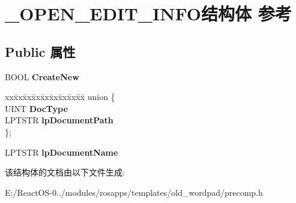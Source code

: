 \hypertarget{struct___o_p_e_n___e_d_i_t___i_n_f_o}{}\section{\+\_\+\+O\+P\+E\+N\+\_\+\+E\+D\+I\+T\+\_\+\+I\+N\+F\+O结构体 参考}
\label{struct___o_p_e_n___e_d_i_t___i_n_f_o}
\subsection*{Public 属性}
\begin{DoxyCompactItemize}
\item 
\mbox{\label{struct___o_p_e_n___e_d_i_t___i_n_f_o_a209497dd2a4aeb781d297c8f31c56e77}} 
B\+O\+OL {\bfseries Create\+New}
\item 
\mbox{\label{struct___o_p_e_n___e_d_i_t___i_n_f_o_a40269d2e3053359b0c18fdea179f8528}} 
\begin{tabbing}
xx\=xx\=xx\=xx\=xx\=xx\=xx\=xx\=xx\=\kill
union \{\\
\>UINT {\bfseries DocType}\\
\>LPTSTR {\bfseries lpDocumentPath}\\
\}; \\

\end{tabbing}\item 
\mbox{\label{struct___o_p_e_n___e_d_i_t___i_n_f_o_ad94b848061038ec3cb8398547ef94efd}} 
L\+P\+T\+S\+TR {\bfseries lp\+Document\+Name}
\end{DoxyCompactItemize}


该结构体的文档由以下文件生成\+:\begin{DoxyCompactItemize}
\item 
E\+:/\+React\+O\+S-\/0../modules/rosapps/templates/old\+\_\+wordpad/precomp.\+h\end{DoxyCompactItemize}
